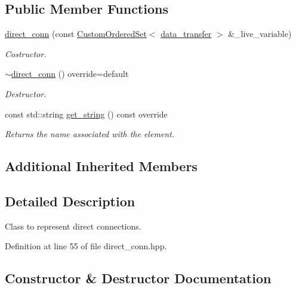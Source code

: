 \subsection*{Public Member Functions}
\begin{DoxyCompactItemize}
\item 
\hyperlink{classdirect__conn_a25cb6f6c42b03bddf31f07306e7300dd}{direct\+\_\+conn} (const \hyperlink{classCustomOrderedSet}{Custom\+Ordered\+Set}$<$ \hyperlink{conn__binding_8hpp_ae44ffa64566f2bb3ce6941833ac940fb}{data\+\_\+transfer} $>$ \&\+\_\+live\+\_\+variable)
\begin{DoxyCompactList}\small\item\em Costructor. \end{DoxyCompactList}\item 
\hyperlink{classdirect__conn_ae86d358d318711ea9e3cf6f658f75e07}{$\sim$direct\+\_\+conn} () override=default
\begin{DoxyCompactList}\small\item\em Destructor. \end{DoxyCompactList}\item 
const std\+::string \hyperlink{classdirect__conn_a4c6df2aa88c8c522a1aee042ff58a0c3}{get\+\_\+string} () const override
\begin{DoxyCompactList}\small\item\em Returns the name associated with the element. \end{DoxyCompactList}\end{DoxyCompactItemize}
\subsection*{Additional Inherited Members}


\subsection{Detailed Description}
Class to represent direct connections. 

Definition at line 55 of file direct\+\_\+conn.\+hpp.



\subsection{Constructor \& Destructor Documentation}
\mbox{\label{classdirect__conn_a25cb6f6c42b03bddf31f07306e7300dd}} 
